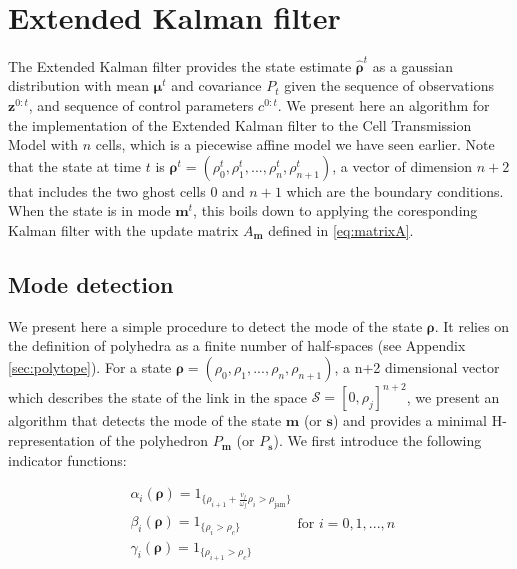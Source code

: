 \section{Extended Kalman filter}

The Extended Kalman filter provides the state estimate $\hat{\boldsymbol\rho}^{t}$ as a gaussian distribution with mean $\boldsymbol\mu^{t}$ and covariance $P_{t}$ given the sequence of observations $\boldsymbol z^{0:t}$, and sequence of control parameters $c^{0:t}$. We present here an algorithm for the implementation of the Extended Kalman filter to the Cell Transmission Model with $n$ cells, which is a piecewise affine model we have seen earlier. Note that the state at time $t$ is $\boldsymbol\rho^{t} = (\rho^{t}_{0},\rho^{t}_{1},...,\rho^{t}_{n},\rho^{t}_{n+1})$, a vector of dimension $n+2$ that includes the two ghost cells $0$ and $n+1$ which are the boundary conditions. When the state is in mode $\boldsymbol m^{t}$, this boils down to applying the coresponding Kalman filter with the update matrix $A_{\boldsymbol m}$ defined in \ref{eq:matrixA}.


\subsection{Mode detection}

We present here a simple procedure to detect the mode of the state $\boldsymbol\rho$. It relies on the definition of polyhedra as a finite number of half-spaces (see Appendix \ref{sec:polytope}). For a state $\boldsymbol\rho = (\rho_{0},\rho_{1},...,\rho_{n},\rho_{n+1})$, a n+2 dimensional vector which describes the state of the link in the space $\mathcal{S} = [0,\rho_{j}]^{n+2}$, we present an algorithm that detects the mode of the state $\boldsymbol m$ (or $\boldsymbol s$) and provides a minimal H-representation of the polyhedron $P_{\boldsymbol m}$ (or $P_{\boldsymbol s}$). We first introduce the following indicator functions:

\begin{equation}
\begin{array}{l}
\alpha_{i}(\boldsymbol\rho)=1_{\{\rho_{i+1} + \frac{v_{f}}{\omega_{f}}\rho_{i}>\rho_{\text{jam}}\}}\\
\beta_{i}(\boldsymbol\rho)=1_{\{\rho_{i}>\rho_{c}\}}\\
\gamma_{i}(\boldsymbol\rho)=1_{\{\rho_{i+1}>\rho_{c}\}}
\end{array}
\text{for }i=0,1,...,n
\label{eq:indicators}
\end{equation}

